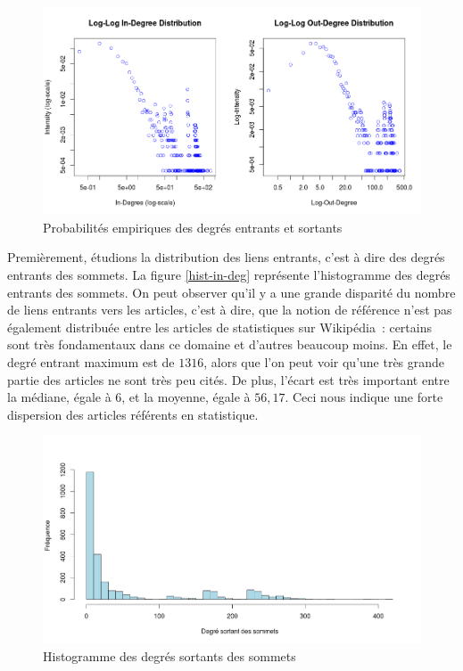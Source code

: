 \documentclass[a4paper]{article}
\begin{document}
\begin{figure}[h!]
   \centering
   \caption{\label{log-log-deg} Probabilités empiriques des degrés entrants et sortants}
   \includegraphics[scale=0.35]{../images/log-log-dist-deg}
\end{figure}


Premièrement, étudions la distribution des liens entrants, c'est à dire des degrés entrants des sommets. La figure \ref{hist-in-deg} représente l'histogramme des degrés entrants des sommets. On peut observer qu'il y a une grande disparité du nombre de liens entrants vers les articles, c'est à dire, que la notion de référence n'est pas également distribuée entre les articles de statistiques sur Wikipédia~: certains sont très fondamentaux dans ce domaine et d'autres beaucoup moins. En effet, le degré entrant maximum est de $1316$, alors que l'on peut voir qu'une très grande partie des articles ne sont très peu cités. De plus, l'écart est très important entre la médiane, égale à 6, et la moyenne, égale à $56,17$. Ceci nous indique une forte dispersion des articles référents en statistique. 

\begin{figure}[h!]
   \centering
   \caption{\label{hist-out-deg} Histogramme des degrés sortants des sommets}
   \includegraphics[scale=0.40]{../images/vertex_out_dist}
\end{figure}
\end{document}
